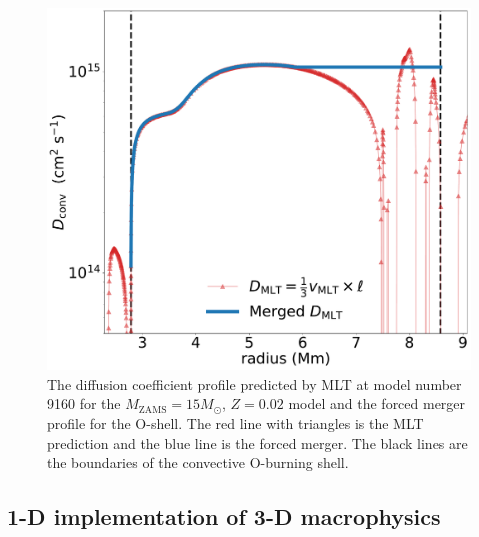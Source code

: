 \begin{figure}[!htbp]
\includegraphics[width=\textwidth]{chapters/2/figures/Dmlt_forced.pdf}
\caption{The diffusion coefficient profile predicted by MLT at model number 9160 for the $M_{\mathrm{ZAMS}}=15 M_\odot$, $Z=0.02$ model and the forced merger profile for the O-shell. The red line with triangles is the MLT prediction and the blue line is the forced merger. The black lines are the boundaries of the convective O-burning shell. 
\label{fig:dmlt_forced}}
\end{figure}

\subsection{1-D implementation of 3-D macrophysics}\label{sec:mixing_methods}

